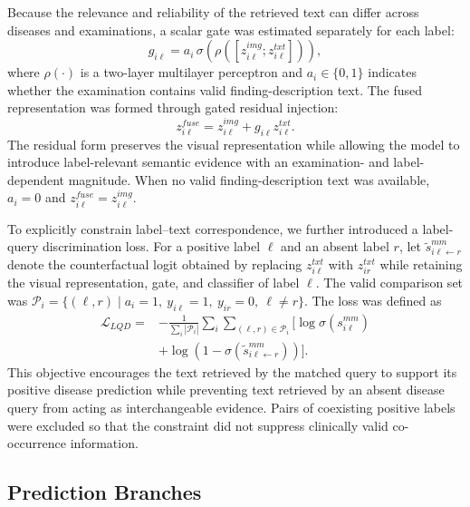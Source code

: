 \documentclass[Afour,sagev,times]{sagej}
\begin{document}
Because the relevance and reliability of the retrieved text can differ across diseases and examinations, a scalar gate was estimated separately for each label:
\begin{equation}
g_{i\ell}=a_i\,\sigma\!\left(\rho([z_{i\ell}^{img};z_{i\ell}^{txt}])\right),
\end{equation}
where $\rho(\cdot)$ is a two-layer multilayer perceptron and $a_i\in\{0,1\}$ indicates whether the examination contains valid finding-description text. The fused representation was formed through gated residual injection:
\begin{equation}
z_{i\ell}^{fuse}=z_{i\ell}^{img}+g_{i\ell}z_{i\ell}^{txt}.
\end{equation}
The residual form preserves the visual representation while allowing the model to introduce label-relevant semantic evidence with an examination- and label-dependent magnitude. When no valid finding-description text was available, $a_i=0$ and $z_{i\ell}^{fuse}=z_{i\ell}^{img}$.

To explicitly constrain label--text correspondence, we further introduced a label-query discrimination loss. For a positive label $\ell$ and an absent label $r$, let $\widetilde{s}_{i\ell\leftarrow r}^{mm}$ denote the counterfactual logit obtained by replacing $z_{i\ell}^{txt}$ with $z_{ir}^{txt}$ while retaining the visual representation, gate, and classifier of label $\ell$. The valid comparison set was $\mathcal{P}_i=\{(\ell,r)\mid a_i=1,\ y_{i\ell}=1,\ y_{ir}=0,\ \ell\neq r\}$. The loss was defined as
\begin{equation}
\begin{aligned}
\mathcal{L}_{LQD}={}&-\frac{1}{\sum_i|\mathcal{P}_i|}
\sum_i\sum_{(\ell,r)\in\mathcal{P}_i}\Big[
\log\sigma(s_{i\ell}^{mm})\\
&+\log\left(1-\sigma(\widetilde{s}_{i\ell\leftarrow r}^{mm})\right)\Big].
\end{aligned}
\end{equation}
This objective encourages the text retrieved by the matched query to support its positive disease prediction while preventing text retrieved by an absent disease query from acting as interchangeable evidence. Pairs of coexisting positive labels were excluded so that the constraint did not suppress clinically valid co-occurrence information.

\subsection{Prediction Branches}
\end{document}
